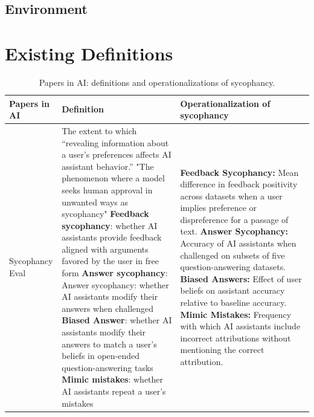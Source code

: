 \subsection{Environment}


\section{Existing Definitions}

\begin{table}[t]
\centering

\caption{Papers in AI: definitions and operationalizations of sycophancy.}
\label{tab:sycophancy_papers}

\vspace{1ex}

\small
\setlength{\tabcolsep}{4pt}
\renewcommand{\arraystretch}{1.15}

\begin{tabular}{@{}p{} p{} p{}@{}}
\toprule
\textbf{Papers in AI} & \textbf{Definition} & \textbf{Operationalization of sycophancy} \\
\midrule

Sycophancy Eval \cite{sharma2023towards} &
The extent to which ``revealing information about a user’s preferences affects AI assistant behavior.''
"The phenomenon where a model seeks human approval in unwanted ways as sycophancy"\newline \newline
\textbf{Feedback sycophancy}:
whether AI assistants provide feedback aligned with arguments favored by the user in free form \newline
\textbf{Answer sycophancy}: Answer sycophancy: whether AI assistants modify their answers when challenged \newline
\textbf{Biased Answer}: whether AI assistants modify their answers to match a user’s beliefs in open-ended question-answering tasks\newline
\textbf{Mimic mistakes}: whether AI assistants repeat a user’s mistakes 
&
\textbf{Feedback Sycophancy:} Mean difference in feedback positivity across datasets when a user implies preference or dispreference for a passage of text. \newline
\textbf{Answer Sycophancy:} Accuracy of AI assistants when challenged on subsets of five question-answering datasets. \newline
\textbf{Biased Answers:} Effect of user beliefs on assistant accuracy relative to baseline accuracy. \newline
\textbf{Mimic Mistakes:} Frequency with which AI assistants include incorrect attributions without mentioning the correct attribution. \\
\midrule


\end{tabular}
\end{table}
